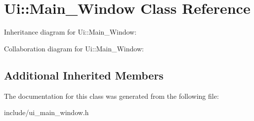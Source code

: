 \hypertarget{classUi_1_1Main__Window}{}\section{Ui\+:\+:Main\+\_\+\+Window Class Reference}
\label{classUi_1_1Main__Window}


Inheritance diagram for Ui\+:\+:Main\+\_\+\+Window\+:


Collaboration diagram for Ui\+:\+:Main\+\_\+\+Window\+:
\subsection*{Additional Inherited Members}


The documentation for this class was generated from the following file\+:\begin{DoxyCompactItemize}
\item 
include/ui\+\_\+main\+\_\+window.\+h\end{DoxyCompactItemize}
